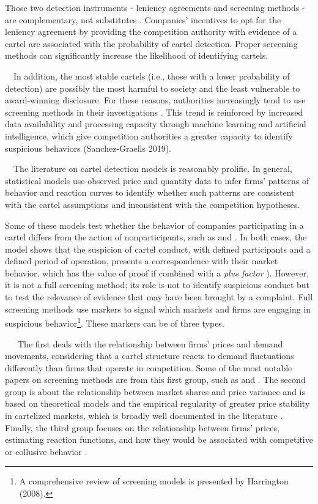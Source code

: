 \documentclass[10pt]{article}
\begin{document}
Those two detection instruments - leniency agreements and screening methods - are complementary, not substitutes  \cite{hüschelrath2014cartel}  \cite{schinkel2013balancing}. Companies’ incentives to opt for the leniency agreement by providing the competition authority with evidence of a cartel are associated with the probability of cartel detection. Proper screening methods can significantly increase the likelihood of identifying cartels.

\ \ In addition, the most stable cartels (i.e., those with a lower probability of detection) are possibly the most harmful to society and the least vulnerable to award-winning disclosure. For these reasons, authorities increasingly tend to use screening methods in their investigations  \cite{schinkel2013balancing}  \cite{imhof2018screening}. This trend is reinforced by increased data availability and processing capacity through machine learning and artificial intelligence, which give competition authorities a greater capacity to identify suspicious behaviors (Sanchez-Graells 2019).

\ \ The literature on cartel detection models is reasonably prolific. In general, statistical models use observed price and quantity data to infer firms’ patterns of behavior and reaction curves to identify whether such patterns are consistent with the cartel assumptions and inconsistent with the competition hypotheses.

Some of these models test whether the behavior of companies participating in a cartel differs from the action of nonparticipants, such as  \cite{porter1993detection} and  \cite{porter1999ohio}. In both cases, the model shows that the suspicion of cartel conduct, with defined participants and a defined period of operation, presents a correspondence with their market behavior, which has the value of proof if combined with a \textit{plus factor}  \cite{hovenkamp2005federal}). However, it is not a full screening method; its role is not to identify suspicious conduct but to test the relevance of evidence that may have been brought by a complaint. Full screening methods use markers to signal which markets and firms are engaging in suspicious behavior\footnote{ A comprehensive review of screening models is presented by Harrington (2008).}. These markers can be of three types.

\ \ \ The first deals with the relationship between firms’ prices and demand movements, considering that a cartel structure reacts to demand fluctuations differently than firms that operate in competition. Some of the most notable papers on screening methods are from this first group, such as  \cite{green1984noncooperative} and  \cite{haltiwanger1991the}. The second group is about the relationship between market shares and price variance and is based on theoretical models and the empirical regularity of greater price stability in cartelized markets, which is broadly well documented in the literature  \cite{abrantesmetz2006a}  \cite{imhof2019detecting}. Finally, the third group focuses on the relationship between firms’ prices, estimating reaction functions, and how they would be associated with competitive or collusive behavior  \cite{bajari2003deciding}.
\end{document}
